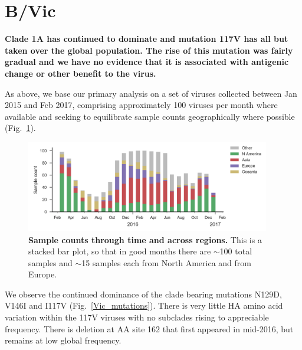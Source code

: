 \documentclass[11pt,oneside,letterpaper]{article}
\begin{document}
\clearpage
\pagebreak

\section*{B/Vic}

\textbf{Clade 1A has continued to dominate and mutation 117V has all but taken over the global population.
The rise of this mutation was fairly gradual and we have no evidence that it is associated with antigenic change or other benefit to the virus.}

As above, we base our primary analysis on a set of viruses collected between Jan 2015 and Feb 2017, comprising approximately 100 viruses per month where available and seeking to equilibrate sample counts geographically where possible (Fig.\ \ref{Vic_counts}).

\begin{figure}[H]
	\centering
	\includegraphics[width=0.95\textwidth]{../figures/feb-2017/Vic_counts.png}
	\caption{\textbf{Sample counts through time and across regions.}
	This is a stacked bar plot, so that in good months there are $\sim$100 total samples and $\sim$15 samples each from North America and from Europe.
	}
	\label{Vic_counts}
\end{figure}

\pagebreak

We observe the continued dominance of the clade bearing mutations N129D, V146I and I117V (Fig.\ \ref{Vic_mutations}).
There is very little HA amino acid variation within the 117V viruses with no subclades rising to appreciable frequency.
There is deletion at AA site 162 that first appeared in mid-2016, but remains at low global frequency.
\end{document}

